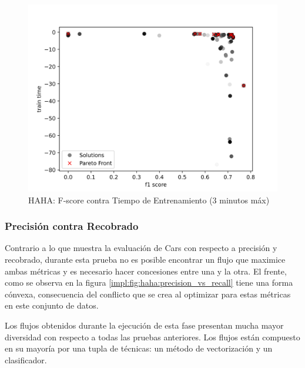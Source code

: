 \begin{figure}[ht]
    \centering
    \includegraphics[scale=0.65]{Pictures/haha_fscore_vs_time_3min.jpg}
    \caption{HAHA: F-score contra Tiempo de Entrenamiento (3 minutos m\'ax)}
    \label{impl:fig:haha:fscore_vs_time_3min}
\end{figure}

\subsubsection{Precisi\'on contra Recobrado}
Contrario a lo que muestra la evaluaci\'on de Cars con respecto a precisi\'on y recobrado, durante esta prueba no es posible encontrar un flujo que maximice ambas m\'etricas y es necesario hacer concesiones entre una y la otra. El frente, como se observa en la figura \ref{impl:fig:haha:precision_vs_recall} tiene una forma c\'onvexa, consecuencia del conflicto que se crea al optimizar para estas m\'etricas en este conjunto de datos.

Los flujos obtenidos durante la ejecuci\'on de esta fase presentan mucha mayor diversidad con respecto a todas las pruebas anteriores. Los flujos est\'an compuesto en su mayor\'ia por una tupla de t\'ecnicas: un m\'etodo de vectorizaci\'on y un clasificador.

